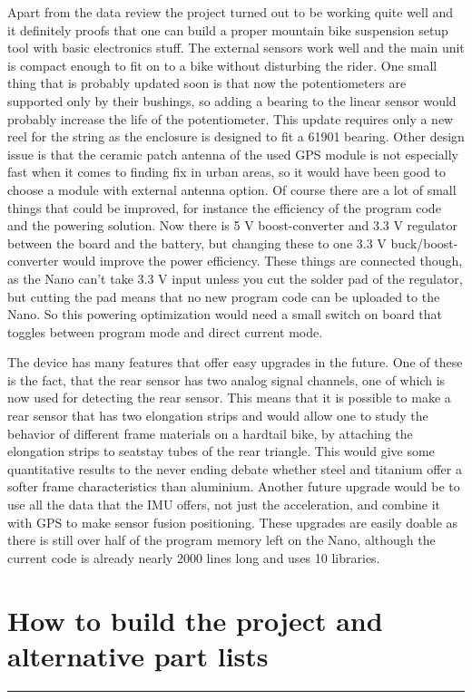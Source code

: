 \documentclass[a4paper,11pt]{article}
\begin{document}
Apart from the data review the project turned out to be working quite well and it definitely proofs that one can build a proper mountain bike suspension setup tool with basic electronics stuff. The external sensors work well and the main unit is compact enough to fit on to a bike without disturbing the rider. One small thing that is probably updated soon is that now the potentiometers are supported only by their bushings, so adding a bearing to the linear sensor would probably increase the life of the potentiometer. This update requires only a new reel for the string as the enclosure is designed to fit a 61901 bearing. Other design issue is that the ceramic patch antenna of the used GPS module is not especially fast when it comes to finding fix in urban areas, so it would have been good to choose a module with external antenna option. Of course there are a lot of small things that could be improved, for instance the efficiency of the program code and the powering solution. Now there is 5 V boost-converter and 3.3 V regulator between the board and the battery, but changing these to one 3.3 V buck/boost-converter would improve the power efficiency. These things are connected though, as the Nano can't take 3.3 V input unless you cut the solder pad of the regulator, but cutting the pad means that no new program code can be uploaded to the Nano. So this powering optimization would need a small switch on board that toggles between program mode and direct current mode.

The device has many features that offer easy upgrades in the future. One of these is the fact, that the rear sensor has two analog signal channels, one of which is now used for detecting the rear sensor. This means that it is possible to make a rear sensor that has two elongation strips and would allow one to study the behavior of different frame materials on a hardtail bike, by attaching the elongation strips to seatstay tubes of the rear triangle. This would give some quantitative results to the never ending debate whether steel and titanium offer a softer frame characteristics than aluminium. Another future upgrade would be to use all the data that the IMU offers, not just the acceleration, and combine it with GPS to make sensor fusion positioning. These upgrades are easily doable as there is still over half of the program memory left on the Nano, although the current code is already nearly 2000 lines long and uses 10 libraries.


\newpage
\section{How to build the project and alternative part lists}
\label{sec:building}
\rule{12.7cm}{0.4pt}
\end{document}
